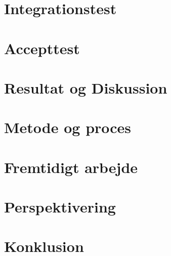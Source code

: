 \documentclass[a4paper, 11pt,oneside,openany, danish]{memoir} %
\begin{document}
\chapter{Integrationstest}
\chapter{Accepttest}
\chapter{Resultat og Diskussion}
\chapter{Metode og proces}
\chapter{Fremtidigt arbejde}
\chapter{Perspektivering}
\chapter{Konklusion}

\printbibliography
\end{document}
